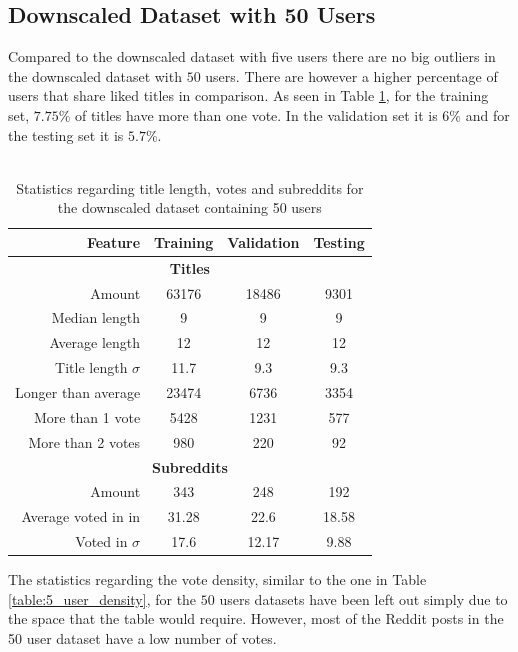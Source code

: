 \subsection{Downscaled Dataset with 50 Users}
Compared to the downscaled dataset with five users there are no big outliers in the downscaled dataset with $50$ users. There are however a higher percentage of users that share liked titles in comparison. As seen in Table \ref{table:50_user_stats}, for the training set, $7.75\%$ of titles have more than one vote. In the validation set it is $6\%$ and for the testing set it is $5.7\%$.
\\\\
\begin{table}[h!]
    \centering
    \begin{tabular}{ r | c | c | c }
    \textbf{Feature} & \textbf{Training} & \textbf{Validation} & \textbf{Testing} \\ \hline \hline
    \multicolumn{4}{c}{\textbf{Titles}} \\ \hline \hline
    Amount & 63176 & 18486 & 9301 \\ \hline
    Median length & 9 & 9 & 9 \\ \hline
    Average length & 12 & 12 & 12  \\ \hline
    Title length $\sigma$ & 11.7 & 9.3 & 9.3 \\ \hline
    Longer than average & 23474 & 6736 & 3354 \\ \hline
    More than 1 vote & 5428 & 1231 & 577 \\ \hline
    More than 2 votes & 980 & 220 & 92\\ \hline \hline
    \multicolumn{4}{c}{\textbf{Subreddits}} \\ \hline \hline
    Amount & 343 & 248 & 192  \\ \hline
    Average voted in in & 31.28 & 22.6 & 18.58 \\ \hline
    Voted in $\sigma$ & 17.6 & 12.17 & 9.88  \\ \hline
    \end{tabular}
    \caption{Statistics regarding title length, votes and subreddits for the downscaled dataset containing 50 users}
    \label{table:50_user_stats}
\end{table}
The statistics regarding the vote density, similar to the one in Table \ref{table:5_user_density}, for the $50$ users datasets have been left out simply due to the space that the table would require. However, most of the Reddit posts in the 50 user dataset have a low number of votes.
